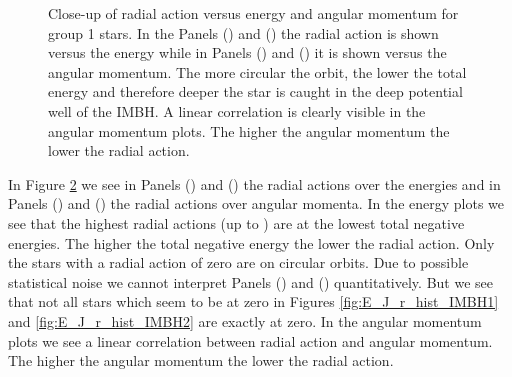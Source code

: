 \begin{figure}[htbp]
\begin{subfigure}{0.475\textwidth}
	\label{fig:L_J_r_justIMBH_2}
	\end{subfigure}	
\caption{Close-up of radial action versus energy and angular momentum for group 1 stars. In the Panels () and () the radial action is shown versus the energy while in Panels () and () it is shown versus the angular momentum. The more circular the orbit, the lower the total energy and therefore deeper the star is caught in the deep potential well of the \ac{IMBH}. A linear correlation is clearly visible in the angular momentum plots. The higher the angular momentum the lower the radial action.}
\label{fig:just_IMBH_hist}	
\end{figure}
In Figure \ref{fig:just_IMBH_hist} we see in Panels () and () the radial actions over the energies and in Panels () and () the radial actions over angular momenta. In the energy plots we see that the highest radial actions (up to ) are at the lowest total negative energies. The higher the total negative energy the lower the radial action. Only the stars with a radial action of zero are on circular orbits. Due to possible statistical noise we cannot interpret Panels () and () quantitatively. But we see that not all stars which seem to be at zero in Figures \ref{fig:E_J_r_hist_IMBH1} and \ref{fig:E_J_r_hist_IMBH2} are exactly at zero. In the angular momentum plots we see a linear correlation between radial action and angular momentum. The higher the angular momentum the lower the radial action. 

